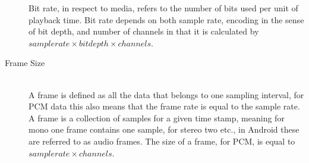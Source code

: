 \begin{description}
    Bit rate, in respect to media, refers to the number of bits used per unit of playback time.
    Bit rate depends on both sample rate, encoding in the sense of bit depth, and number of channels in that it is calculated by $sample rate \times bit depth \times channels$.
    \item [Frame Size]\cite{audioformat} \hfill \\
    A frame is defined as all the data that belongs to one sampling interval, for \ac{PCM} data this also means that the frame rate is equal to the sample rate.
    A frame is a collection of samples for a given time stamp, meaning for mono one frame contains one sample, for stereo two etc., in Android these are referred to as audio frames.
    The size of a frame, for \ac{PCM}, is equal to $sample rate \times channels$.
\end{description}

